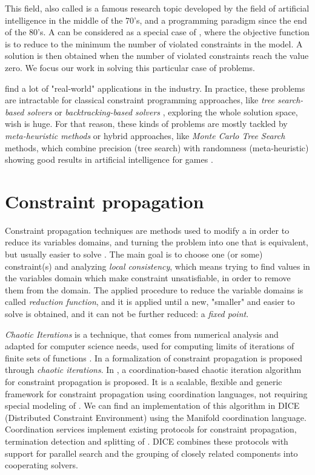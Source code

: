 This field, also called \CP{} is a famous research topic developed by the field of artificial intelligence in the middle of the 70's, and a programming paradigm since the end of the 80's. A \csp{} can be considered as a special case of \COPs, where the objective function is to reduce to the minimum the number of violated constraints in the model. A solution is then obtained when the number of violated constraints reach the value zero. We focus our work in solving this particular case of problems.

\csps{} find a lot of "real-world" applications in the industry. In practice, these problems are intractable for classical constraint programming approaches, like \textit{tree search-based solvers} or {\it backtracking-based solvers} \cite{Abio2014}, exploring the whole solution space, wish is huge. For that reason, these kinds of problems are mostly tackled by {\it meta-heuristic methods} or hybrid approaches, like \textit{Monte Carlo Tree Search} methods, which combine precision (tree search) with randomness (meta-heuristic) showing good results in artificial intelligence for games \cite{Chaslot2008, Browne2012}.

\section{Constraint propagation}\label{sec:progagation}

Constraint propagation techniques are methods used to modify a \CSP{} in order to reduce its variables domains, and turning the problem into one that is equivalent, but usually easier to solve \cite{ChristianBessiere2006}. The main goal is to choose one (or some) constraint(s) and analyzing \textit{local consistency}, which means trying to find values in the variables domain which make constraint unsatisfiable, in order to remove them from the domain. The applied procedure to reduce the variable domains is called \textit{reduction function}, and it is applied until a new, "smaller" and easier to solve is obtained, and it can not be further reduced: a \textit{fixed point}.

\textit{Chaotic Iterations} is a technique, that comes from numerical analysis and adapted for computer science needs, used for computing limits of iterations of finite sets of functions \cite{Chazan1969, Cousot1977}. In \cite{Apt,Monfroy} a formalization of constraint propagation is proposed through {\it chaotic iterations}. In \cite{Monfroy2000}, a coordination-based chaotic iteration algorithm for constraint propagation is proposed. It is a scalable, flexible and generic framework for constraint propagation using coordination languages, not requiring special modeling of \csps. We can find an implementation of this algorithm in {\sc DICE} (Distributed Constraint Environment) \cite{Zoeteweij2003} using the {\sc Manifold} coordination language. Coordination services implement existing protocols for constraint propagation, termination detection and splitting of \csps. {\sc DICE} combines these protocols with support for parallel search and the grouping of closely related components into cooperating solvers.

